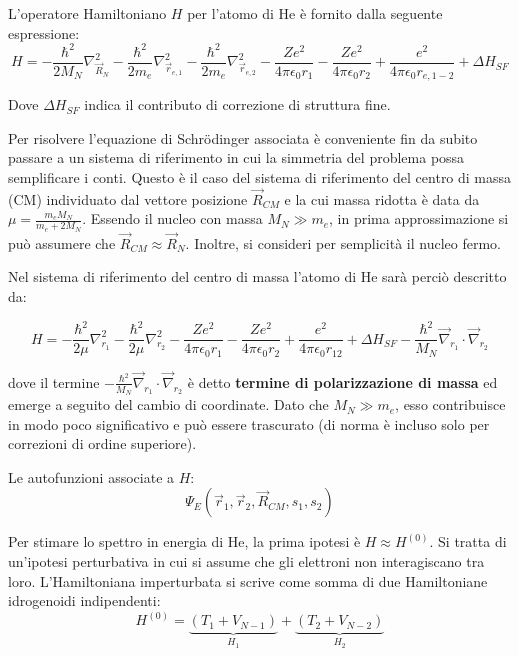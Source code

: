 L'operatore Hamiltoniano \( H \) per l'atomo di He è fornito dalla seguente espressione:
\begin{equation}
    H = -\frac{\hbar^2}{2M_N} \nabla_{\vec{R}_N}^2 - \frac{\hbar^2}{2m_e} \nabla_{\vec{r}_{e,1}}^2 - \frac{\hbar^2}{2m_e} \nabla_{\vec{r}_{e,2}}^2 - \frac{Ze^2}{4\pi\epsilon_0 r_1} - \frac{Ze^2}{4\pi\epsilon_0 r_2} + \frac{e^2}{4\pi\epsilon_0 r_{e,1-2}} + \Delta H_{SF}
\end{equation}

Dove \( \Delta H_{SF} \) indica il contributo di correzione di struttura fine.

Per risolvere l'equazione di Schrödinger associata è conveniente fin da subito passare a un sistema di riferimento in cui la simmetria del problema possa semplificare i conti. 
Questo è il caso del sistema di riferimento del centro di massa (CM) individuato dal vettore posizione \( \vec{R}_{CM} \) e la cui massa ridotta è data da \( \mu = \frac{m_e M_N}{m_e + 2M_N} \).
Essendo il nucleo con massa \( M_N \gg m_e \), in prima approssimazione si può assumere che \( \vec{R}_{CM} \approx \vec{R}_N \). Inoltre, si consideri per semplicità il nucleo fermo.

Nel sistema di riferimento del centro di massa l'atomo di He sarà perciò descritto da:

\begin{equation}
    H = -\frac{\hbar^2}{2\mu} \nabla_{r_1}^2 - \frac{\hbar^2}{2\mu} \nabla_{r_2}^2 - \frac{Ze^2}{4\pi\epsilon_0 r_1} - \frac{Ze^2}{4\pi\epsilon_0 r_2} + \frac{e^2}{4\pi\epsilon_0 r_{12}} + \Delta H_{SF} - \frac{\hbar^2}{M_N} \vec{\nabla}_{r_1} \cdot \vec{\nabla}_{r_2}
\end{equation}

dove il termine \( -\frac{\hbar^2}{M_N} \vec{\nabla}_{r_1} \cdot \vec{\nabla}_{r_2} \) è detto \textbf{termine di polarizzazione di massa} ed emerge a seguito del cambio di coordinate. Dato che \( M_N \gg m_e \), esso contribuisce in modo poco significativo e può essere trascurato (di norma è incluso solo per correzioni di ordine superiore).

Le autofunzioni associate a \( H \):
\begin{equation}
    \Psi_E(\vec{r}_1, \vec{r}_2, \vec{R}_{CM}, s_1, s_2)
\end{equation}

Per stimare lo spettro in energia di He, la prima ipotesi è \( H \approx H^{(0)} \). Si tratta di un'ipotesi perturbativa in cui si assume che gli elettroni non interagiscano tra loro. L'Hamiltoniana imperturbata si scrive come somma di due Hamiltoniane idrogenoidi indipendenti:
\begin{equation}
    H^{(0)} = \underbrace{(T_1 + V_{N-1})}_{H_1} + \underbrace{(T_2 + V_{N-2})}_{H_2}
\end{equation}


